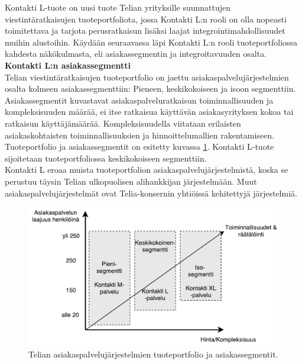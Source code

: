 \documentclass[finnish,12pt,a4paper,pdftex]{article}
\begin{document}
Kontakti L-tuote on uusi tuote Telian yrityksille suunnattujen viestintäratkaisujen tuoteportfoliota, jossa Kontakti L:n rooli on olla nopeasti toimitettava ja tarjota perusratkaisun lisäksi laajat integrointimahdollisuudet muihin alustoihin. Käydään seuraavassa läpi Kontakti L:n rooli tuoteportfoliossa kahdesta näkökulmasta, eli asiakassegmentin ja integroitavuuden osalta.\\

\textbf{Kontakti L:n asiakassegmentti}\\

\noindent Telian viestintäratkaisujen tuoteportfolio on jaettu asiakaspalvelujärjestelmien osalta kolmeen asiakassegmenttiin: Pieneen, keskikokoiseen ja isoon segmenttiin. Asiakassegmentit kuvastavat asiakaspalveluratkaisun toiminnallisuuden ja kompleksisuuden määrää, ei itse ratkaisua käyttävän asiakasyrityksen kokoa tai ratkaisun käyttäjämäärää. Kompleksisuudella viitataan erilaisten asiakaskohtaisten toiminnallisuuksien ja hinnoittelumallien rakentamiseen. Tuoteportfolio ja asiakassegmentit on esitetty kuvassa \ref{fig:segmentit}. Kontakti L-tuote sijoitetaan tuoteportfoliossa keskikokoiseen segmenttiin.\\

\noindent Kontakti L eroaa muista tuoteportfolion asiakaspalvelujärjestelmistä, koska se perustuu täysin Telian ulkopuolisen alihankkijan järjestelmään. Muut asiakaspalvelujärjestelmät ovat Telia-konsernin yhtiöissä kehitettyjä järjestelmiä.\\ 

\begin{figure}[!h]
    \centering
    \includegraphics[scale=0.6]{images/segmentit.pdf}
    \caption{Telian asiakaspalvelujärjestelmien tuoteportfolio ja asiakassegmentit.}
    \label{fig:segmentit}
\end{figure}
\end{document}
